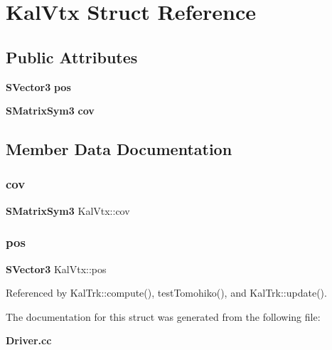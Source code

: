 \section{Kal\+Vtx Struct Reference}
\label{structKalVtx}
\subsection*{Public Attributes}
\begin{DoxyCompactItemize}
\item 
\textbf{ S\+Vector3} \textbf{ pos}
\item 
\textbf{ S\+Matrix\+Sym3} \textbf{ cov}
\end{DoxyCompactItemize}


\subsection{Member Data Documentation}
\mbox{\label{structKalVtx_af8a828c525c9de8deab7bf7d5bbdbace}} 
\subsubsection{cov}
{\footnotesize\ttfamily \textbf{ S\+Matrix\+Sym3} Kal\+Vtx\+::cov}

\mbox{\label{structKalVtx_a927c9a301adf4f70acf4856232083ad6}} 
\subsubsection{pos}
{\footnotesize\ttfamily \textbf{ S\+Vector3} Kal\+Vtx\+::pos}



Referenced by Kal\+Trk\+::compute(), test\+Tomohiko(), and Kal\+Trk\+::update().



The documentation for this struct was generated from the following file\+:\begin{DoxyCompactItemize}
\item 
\textbf{ Driver.\+cc}\end{DoxyCompactItemize}
